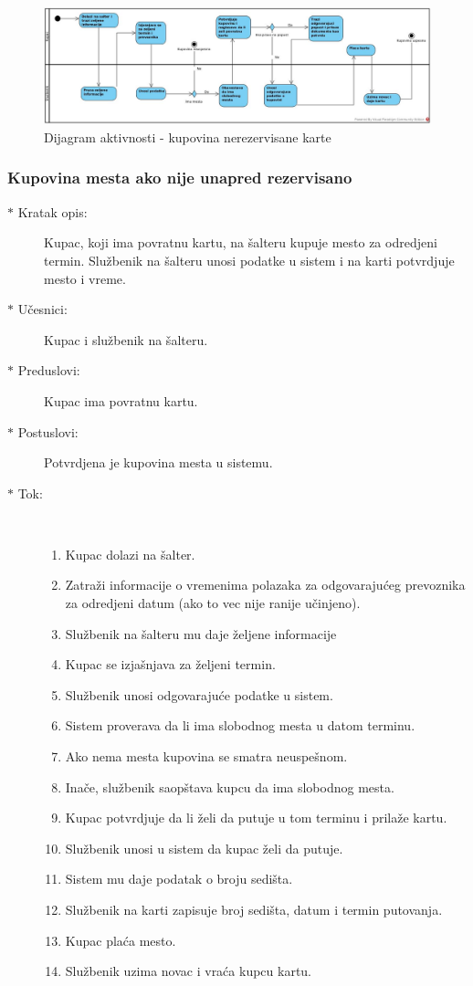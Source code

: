 \begin{figure}[!htb] 
	\centering
	\includegraphics[width=1.2\linewidth]{"../Slike/kupovina"}
	\caption{Dijagram aktivnosti - kupovina nerezervisane karte}
	\label{fig:dijagram-aktivnosti}
\end{figure}

\subsubsection{Kupovina mesta ako nije unapred rezervisano}
\begin{description}
	\item[$\ast$ Kratak opis: ] Kupac, koji ima povratnu kartu, na \v salteru kupuje mesto za odredjeni termin. Slu\v zbenik na \v salteru unosi podatke u sistem i na karti potvrdjuje mesto i vreme.
	\item[$\ast$ U\v cesnici: ] Kupac i slu\v zbenik na \v salteru.
	\item[$\ast$ Preduslovi: ] Kupac ima povratnu kartu.
	\item[$\ast$ Postuslovi: ] Potvrdjena je kupovina mesta u sistemu.
	\item[$\ast$ Tok: ] \ \\
	\begin{enumerate}
		\item Kupac dolazi na \v salter.
		\item Zatra\v zi informacije o vremenima polazaka za odgovaraju\'ceg prevoznika za odredjeni datum (ako to vec nije ranije u\v cinjeno).
		\item Slu\v zbenik na \v salteru mu daje \v zeljene informacije
		\item Kupac se izja\v snjava za \v zeljeni termin.
		\item Slu\v zbenik unosi odgovaraju\'ce podatke u sistem.
		\item Sistem proverava da li ima slobodnog mesta u datom terminu.
		\item Ako nema mesta kupovina se smatra neuspe\v snom.
		\item Ina\v ce, slu\v zbenik saop\v stava kupcu da ima slobodnog mesta.
		\item Kupac potvrdjuje da li \v zeli da putuje u tom terminu i prila\v ze kartu.
		\item Slu\v zbenik unosi u sistem da kupac \v zeli da putuje.
		\item Sistem mu daje podatak o broju sedi\v sta.
		\item Slu\v zbenik na karti zapisuje broj sedi\v sta, datum i termin putovanja.
		\item Kupac pla\'ca mesto.
		\item Slu\v zbenik uzima novac i vra\'ca kupcu kartu.
	\end{enumerate}
\end{description}

